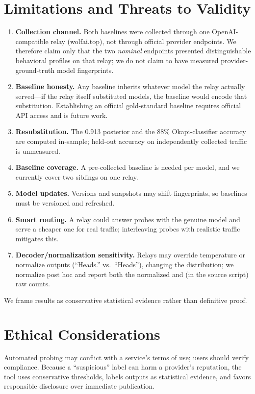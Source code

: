 \documentclass[11pt]{article}
\begin{document}
\section{Limitations and Threats to Validity}
\label{sec:threats}
\begin{enumerate}
\item \textbf{Collection channel.} Both baselines were collected through one OpenAI-compatible relay (wolfai.top), not through official provider endpoints. We therefore claim only that the two \emph{nominal} endpoints presented distinguishable behavioral profiles on that relay; we do not claim to have measured provider-ground-truth model fingerprints.
\item \textbf{Baseline honesty.} Any baseline inherits whatever model the relay actually served---if the relay itself substituted models, the baseline would encode that substitution. Establishing an official gold-standard baseline requires official API access and is future work.
\item \textbf{Resubstitution.} The 0.913 posterior and the 88\% Okapi-classifier accuracy are computed in-sample; held-out accuracy on independently collected traffic is unmeasured.
\item \textbf{Baseline coverage.} A pre-collected baseline is needed per model, and we currently cover two siblings on one relay.
\item \textbf{Model updates.} Versions and snapshots may shift fingerprints, so baselines must be versioned and refreshed.
\item \textbf{Smart routing.} A relay could answer probes with the genuine model and serve a cheaper one for real traffic; interleaving probes with realistic traffic mitigates this.
\item \textbf{Decoder/normalization sensitivity.} Relays may override temperature or normalize outputs (``Heads.'' vs.\ ``Heads''), changing the distribution; we normalize post hoc and report both the normalized and (in the source script) raw counts.
\end{enumerate}
We frame results as conservative statistical evidence rather than definitive proof.

\section{Ethical Considerations}
Automated probing may conflict with a service's terms of use; users should verify compliance. Because a ``suspicious'' label can harm a provider's reputation, the tool uses conservative thresholds, labels outputs as statistical evidence, and favors responsible disclosure over immediate publication.
\end{document}

